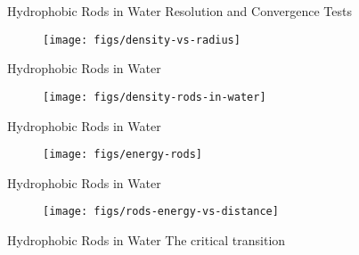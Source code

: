 \documentclass{beamer}
\begin{document}
\begin{frame}[fragile]{Hydrophobic Rods in Water}
Resolution and Convergence Tests
\begin{figure}
\begin{center}
\texttt{[image: figs/density-vs-radius]}
\end{center}
\end{figure} 
\end{frame}

\begin{frame}[fragile]{Hydrophobic Rods in Water}
\begin{figure}
\begin{center}
\texttt{[image: figs/density-rods-in-water]}
\end{center}
\end{figure} 
\end{frame}

\begin{frame}[fragile]{Hydrophobic Rods in Water}
\begin{figure}
\begin{center}
\texttt{[image: figs/energy-rods]}
\end{center}
\end{figure} 
\end{frame}

\begin{frame}[fragile]{Hydrophobic Rods in Water}
\begin{figure}
\begin{center}
\texttt{[image: figs/rods-energy-vs-distance]}
\end{center}
\end{figure} 
\end{frame}

\begin{frame}[fragile]{Hydrophobic Rods in Water}
The critical transition
\end{frame}
\end{document}
